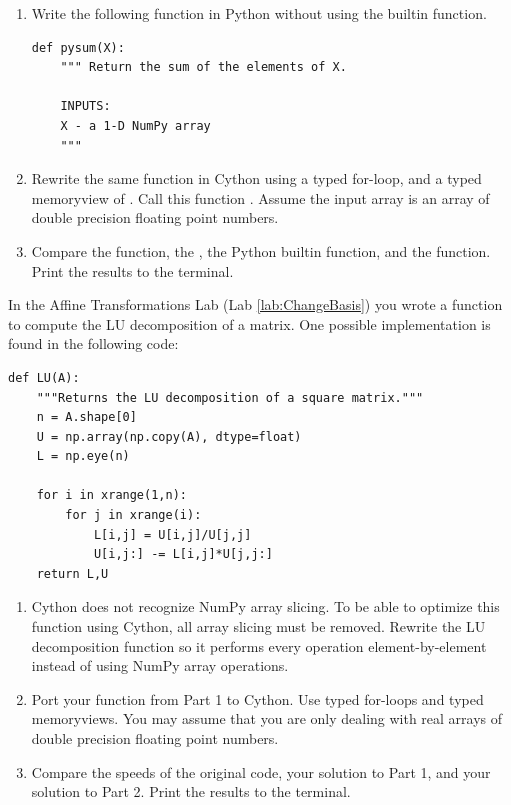 \begin{problem} \label{prob:add}
\leavevmode
\begin{enumerate}
\item Write the following function in Python without using the  builtin function.
\begin{lstlisting}
def pysum(X):
    """ Return the sum of the elements of X.
    
    INPUTS:
    X - a 1-D NumPy array
    """
\end{lstlisting}

\item Rewrite the same function in Cython using a typed for-loop, and a typed memoryview of . Call this function . Assume the input array  is an array of double precision floating point numbers.

\item Compare the  function, the , the Python builtin  function, and the  function. Print the results to the terminal.
\end{enumerate}
\end{problem}

\begin{problem}
In the Affine Transformations Lab (Lab \ref{lab:ChangeBasis}) you wrote a function to compute the LU decomposition of a matrix. One possible implementation is found in the following code:
\begin{lstlisting}
def LU(A):
    """Returns the LU decomposition of a square matrix."""
    n = A.shape[0]
    U = np.array(np.copy(A), dtype=float)
    L = np.eye(n)
    
    for i in xrange(1,n):
        for j in xrange(i):
            L[i,j] = U[i,j]/U[j,j]
            U[i,j:] -= L[i,j]*U[j,j:]
    return L,U
\end{lstlisting}
\begin{enumerate}
\item Cython does not recognize NumPy array slicing. To be able to optimize this function using Cython, all array slicing must be removed. Rewrite the LU decomposition function so it performs every operation element-by-element instead of using NumPy array operations.
\item Port your function from Part 1 to Cython.
Use typed for-loops and typed memoryviews.
You may assume that you are only dealing with real arrays of double precision floating point numbers.
\item Compare the speeds of the original code, your solution to Part 1, and your solution to Part 2. Print the results to the terminal.
\end{enumerate}
\end{problem}

